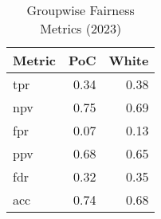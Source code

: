 \begin{table}[ht]
\centering
\begin{tabular}{lrr}
  \hline
Metric & PoC & White \\ 
  \hline
tpr & 0.34 & 0.38 \\ 
  npv & 0.75 & 0.69 \\ 
  fpr & 0.07 & 0.13 \\ 
  ppv & 0.68 & 0.65 \\ 
  fdr & 0.32 & 0.35 \\ 
  acc & 0.74 & 0.68 \\ 
   \hline
\end{tabular}
\caption{Groupwise Fairness Metrics (2023)} 
\label{tab:groupwise_metrics_2023}
\end{table}
